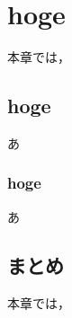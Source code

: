 \chapter{hoge}
  本章では，
  
  \section{hoge}
    あ
    
    \subsection{hoge}
      あ
  
  \section{まとめ}
    本章では，